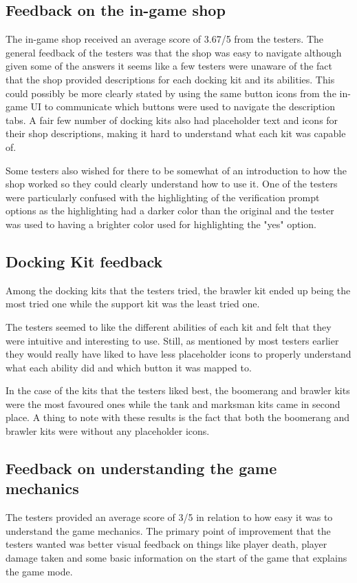 \subsection{Feedback on the in-game shop}
The in-game shop received an average score of 3.67/5 from the testers. The general feedback of the testers was that the shop was easy to navigate although given some of the answers it seems like a few testers were unaware of the fact that the shop provided descriptions for each docking kit and its abilities. This could possibly be more clearly stated by using the same button icons from the in-game UI to communicate which buttons were used to navigate the description tabs. A fair few number of docking kits also had placeholder text and icons for their shop descriptions, making it hard to understand what each kit was capable of. 

Some testers also wished for there to be somewhat of an introduction to how the shop worked so they could clearly understand how to use it. One of the testers were particularly confused with the highlighting of the verification prompt options as the highlighting had a darker color than the original and the tester was used to having a brighter color used for highlighting the "yes" option. 

\subsection{Docking Kit feedback}
Among the docking kits that the testers tried, the brawler kit ended up being the most tried one while the support kit was the least tried one. 

The testers seemed to like the different abilities of each kit and felt that they were intuitive and interesting to use. Still, as mentioned by most testers earlier they would really have liked to have less placeholder icons to properly understand what each ability did and which button it was mapped to.  

In the case of the kits that the testers liked best, the boomerang and brawler kits were the most favoured ones while the tank and marksman kits came in second place. A thing to note with these results is the fact that both the boomerang and brawler kits were without any placeholder icons. 

\subsection{Feedback on understanding the game mechanics}
The testers provided an average score of 3/5 in relation to how easy it was to understand the game mechanics. The primary point of improvement that the testers wanted was better visual feedback on things like player death, player damage taken and some basic information on the start of the game that explains the game mode. 

